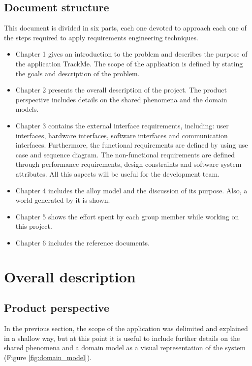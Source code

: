 \documentclass[hidelinks, 12pt]{report}
\begin{document}
\section{Document structure}
This document is divided in six parts, each one devoted to approach each one of the steps required to apply requirements engineering techniques.
\begin{itemize}
\item Chapter 1 gives an introduction to the problem and describes the purpose of the application TrackMe. The scope of the application is defined by stating the goals and description of the problem.
\item Chapter 2 presents the overall description of the project. The product perspective includes details on the shared phenomena and the domain models.
\item Chapter 3 contains the external interface requirements, including: user interfaces, hardware interfaces, software interfaces and communication interfaces. Furthermore, the functional requirements are defined by using use case and sequence diagram. The non-functional requirements are defined through performance requirements, design constraints and software system attributes. All this aspects will be useful for the development team.
\item Chapter 4 includes the alloy model and the discussion of its purpose. Also, a world generated by it is shown.
\item Chapter 5 shows the effort spent by each group member while working on this project.
\item Chapter 6 includes the reference documents.
\end{itemize}

\chapter{Overall description}
\section{Product perspective}
In the previous section, the scope of the application was delimited and explained in a shallow way, but at this point it is useful to include further details on the shared phenomena and a domain model as a visual representation of the system (Figure \ref{fig:domain_model}).   \\
\end{document}
